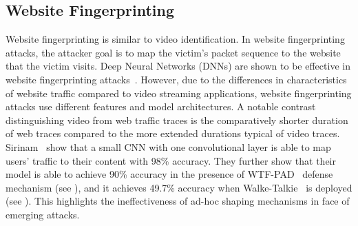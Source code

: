 \subsection{Website Fingerprinting}
Website fingerprinting is similar to video identification.
In website fingerprinting attacks, the attacker goal is to map the victim's packet sequence to the website that the victim visits. 
Deep Neural Networks (DNNs) are shown to be effective in website fingerprinting attacks~\cite{sirinam2018df}.
However, due to the differences in characteristics of website traffic compared to video streaming applications, website fingerprinting attacks use different features and model architectures. 
A notable contrast distinguishing video from web traffic traces is the comparatively shorter duration of web traces compared to the more extended durations typical of video traces.
Sirinam~ show that a small CNN with one convolutional layer is able to map users' traffic to their content with 98\% accuracy.
They further show that their model is able to achieve 90\% accuracy in the presence of WTF-PAD~\cite{juarez2016wtfpad} defense mechanism (see ), and it achieves 49.7\% accuracy when Walke-Talkie~\cite{wang2017walkie} is deployed (see ).
This highlights the ineffectiveness of ad-hoc shaping mechanisms in face of emerging attacks.

